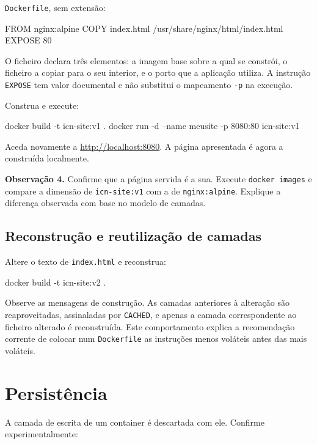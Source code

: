 \documentclass[11pt,a4paper]{article}
\begin{document}
\texttt{Dockerfile}, sem extensão:

\begin{terminal}
FROM nginx:alpine
COPY index.html /usr/share/nginx/html/index.html
EXPOSE 80
\end{terminal}

O ficheiro declara três elementos: a imagem base sobre a qual se constrói, o ficheiro a copiar para o seu interior, e o porto que a aplicação utiliza. A instrução \texttt{EXPOSE} tem valor documental e não substitui o mapeamento \texttt{-p} na execução.

Construa e execute:

\begin{terminal}
docker build -t icn-site:v1 .
docker run -d --name meusite -p 8080:80 icn-site:v1
\end{terminal}

Aceda novamente a \url{http://localhost:8080}. A página apresentada é agora a construída localmente.

\begin{registo}
\textbf{Observação 4.} Confirme que a página servida é a sua. Execute \texttt{docker images} e compare a dimensão de \texttt{icn-site:v1} com a de \texttt{nginx:alpine}. Explique a diferença observada com base no modelo de camadas.
\end{registo}

\subsection{Reconstrução e reutilização de camadas}

Altere o texto de \texttt{index.html} e reconstrua:

\begin{terminal}
docker build -t icn-site:v2 .
\end{terminal}

Observe as mensagens de construção. As camadas anteriores à alteração são reaproveitadas, assinaladas por \texttt{CACHED}, e apenas a camada correspondente ao ficheiro alterado é reconstruída. Este comportamento explica a recomendação corrente de colocar num \texttt{Dockerfile} as instruções menos voláteis antes das mais voláteis.

\section{Persistência}

A camada de escrita de um container é descartada com ele. Confirme experimentalmente:
\end{document}
